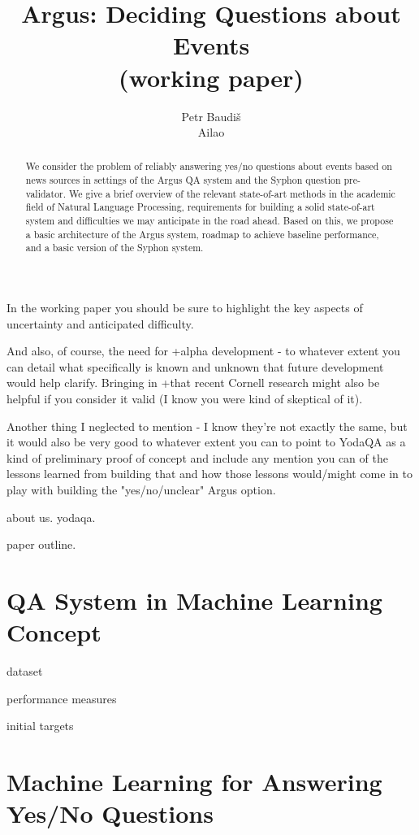 \documentclass[11pt,a4paper]{article}
\title{Argus: Deciding Questions about Events \\ (working paper)}
\author{Petr Baudiš \\ Ailao}
\begin{document}
\maketitle

\begin{abstract}%
	We consider the problem of reliably answering yes/no questions
	about events based on news sources in settings of the Argus QA
	system and the Syphon question pre-validator.
	We give a brief overview of the relevant state-of-art methods
	in the academic field of Natural Language Processing,
	requirements for building a solid state-of-art system
	and difficulties we may anticipate in the road ahead.
	Based on this, we propose a basic architecture of the Argus
	system, roadmap to achieve baseline performance, and a basic
	version of the Syphon system.
\end{abstract}

\vspace{3ex}

{\itshape

In the working paper you should be sure to highlight the key aspects of uncertainty and anticipated difficulty.
	
And also, of course, the need for +alpha development - to whatever extent you
can detail what specifically is known and unknown that future development would
help clarify. Bringing in +that recent Cornell research might also be helpful
if you consider it valid (I know you were kind of skeptical of it).

Another thing I neglected to mention - I know they're not exactly the same, but it would also be very good to whatever extent you can to
point to YodaQA as a kind of preliminary proof of concept and include any mention you can of the lessons learned from building that and how those
lessons would/might come in to play with building the "yes/no/unclear" Argus option.
}

about us.  yodaqa.

paper outline.

\section{QA System in Machine Learning Concept}

dataset

performance measures

initial targets

\section{Machine Learning for Answering Yes/No Questions}
\end{document}
